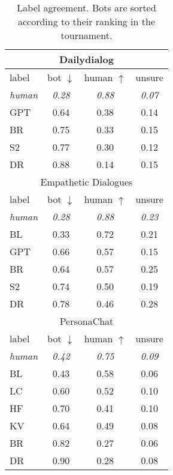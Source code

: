 \begin{table}[ht]
    \centering
    \small
    \begin{tabular}{l|ccc}
    
    \multicolumn{4}{c}{Dailydialog} \\
    \toprule
    label & bot $\downarrow$ & human $\uparrow$ & unsure\\ \hline
    \it human & \it 0.28 & \it 0.88 & \it 0.07\\ 
    GPT & 0.64 & 0.38 & 0.14\\
    BR & 0.75 & 0.33 & 0.15\\
    S2 & 0.77 & 0.30 & 0.12\\
    DR &  0.88 &  0.14 & 0.15\\
    \bottomrule
    

    \multicolumn{4}{c}{Empathetic Dialogues} \\
    \toprule
    label & bot $\downarrow$ & human $\uparrow$ & unsure\\ \hline
    \it human & \it 0.28 & \it 0.88 & \it 0.23\\ 
    BL & 0.33 & 0.72 & 0.21\\
    GPT & 0.66 & 0.57 & 0.15\\
    BR & 0.64 & 0.57 & 0.25\\
    S2 & 0.74 & 0.50 & 0.19\\
    DR & 0.78 & 0.46 & 0.28\\
    \bottomrule
    

    \multicolumn{4}{c}{PersonaChat} \\
    \toprule
    label & bot $\downarrow$ & human $\uparrow$ & unsure\\ \hline
    \it human & \it 0.42 & \it 0.75 & \it 0.09\\ 
    BL & 0.43 & 0.58 & 0.06\\
    LC & 0.60 & 0.52 & 0.10\\
    HF & 0.70 & 0.41 & 0.10\\    
    KV & 0.64 & 0.49 & 0.08\\
    BR & 0.82 & 0.27 & 0.06\\
    DR & 0.90 & 0.28 & 0.08\\
    \bottomrule

    \end{tabular}
    \caption{Label agreement. Bots are sorted according to their ranking in the tournament.}
    \label{tab:agreement_per_label}
\end{table}